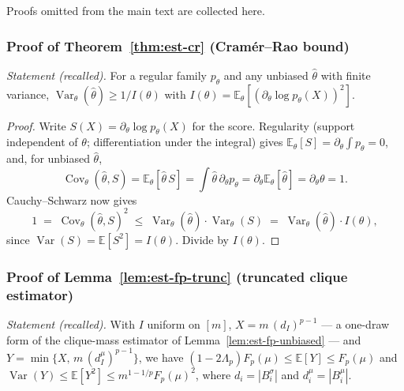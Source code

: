 Proofs omitted from the main text are collected here.

\subsubsection*{Proof of Theorem~\ref{thm:est-cr} (Cram\'er--Rao bound)}
{\itshape Statement (recalled).} For a regular family $p_\theta$ and any unbiased $\hat\theta$
with finite variance, $\operatorname{Var}_\theta(\hat\theta) \ge 1/I(\theta)$ with
$I(\theta) = \mathbb{E}_\theta[(\partial_\theta\log p_\theta(X))^2]$.\eop

\begin{proof}
Write $S(X) = \partial_\theta \log p_\theta(X)$ for the score. Regularity (support independent
of $\theta$; differentiation under the integral) gives $\mathbb{E}_\theta[S] = \partial_\theta
\int p_\theta = 0$, and, for unbiased $\hat\theta$,
\[
\operatorname{Cov}_\theta(\hat\theta, S)
= \mathbb{E}_\theta[\hat\theta\,S]
= \int \hat\theta\,\partial_\theta p_\theta
= \partial_\theta \mathbb{E}_\theta[\hat\theta]
= \partial_\theta \theta = 1.
\]
Cauchy--Schwarz now gives
\[
1 \;=\; \operatorname{Cov}_\theta(\hat\theta,S)^2
\;\le\; \operatorname{Var}_\theta(\hat\theta)\cdot\operatorname{Var}_\theta(S)
\;=\; \operatorname{Var}_\theta(\hat\theta)\cdot I(\theta),
\]
since $\operatorname{Var}(S) = \mathbb{E}[S^2] = I(\theta)$. Divide by $I(\theta)$.
\end{proof}

\subsubsection*{Proof of Lemma~\ref{lem:est-fp-trunc} (truncated clique estimator)}
{\itshape Statement (recalled).} With $I$ uniform on $[m]$, $X = m\,(d_I)^{p-1}$ --- a one-draw
form of the clique-mass estimator of Lemma~\ref{lem:est-fp-unbiased} --- and $Y = \min\{X,\,
m\,(d_I^\mu)^{p-1}\}$, we have $(1-2\Lambda_p)F_p(\mu) \le \mathbb{E}[Y] \le F_p(\mu)$ and
$\operatorname{Var}(Y) \le \mathbb{E}[Y^2] \le m^{1-1/p}F_p(\mu)^2$, where $d_i = |B_i^\sigma|$
and $d_i^\mu = |B_i^\mu|$.\eop

